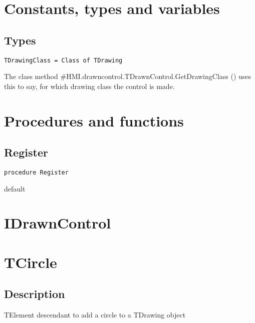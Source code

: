 \section{Constants, types and variables}
\label{drawncontrolconststypesvars}
\subsection{Types}
\label{drawncontroltypes}

\begin{verbatim}
TDrawingClass = Class of TDrawing
\end{verbatim}
\label{hmi:drawncontrol:tdrawingclass}
The class method \#HMI.drawncontrol.TDrawnControl.GetDrawingClass (\pageref{hmi:drawncontrol:tdrawncontrol:getdrawingclass}) uses this to say, for which drawing class the control is made. 

\section{Procedures and functions}
\label{drawncontrolfunctions}
\subsection{Register}
\label{hmi:drawncontrol:register}
\begin{FPCList}
\Declaration 

\begin{verbatim}
procedure Register
\end{verbatim}
\Visibility
default
\end{FPCList}
\section{IDrawnControl}
\label{hmi:drawncontrol:idrawncontrol}
\section{TCircle}
\label{hmi:drawncontrol:tcircle}
\subsection{Description}
TElement descendant to add a circle to a TDrawing object%
